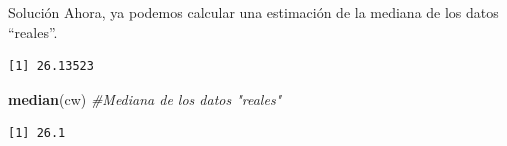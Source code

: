 \documentclass[
  ignorenonframetext,
  aspectratio=169]{beamer}
\newenvironment{Shaded}{\begin{snugshade}}{\end{snugshade}}
\newcommand{\CommentTok}[1]{\textcolor[rgb]{0.56,0.35,0.01}{\textit{#1}}}
\newcommand{\DecValTok}[1]{\textcolor[rgb]{0.00,0.00,0.81}{#1}}
\newcommand{\FunctionTok}[1]{\textcolor[rgb]{0.13,0.29,0.53}{\textbf{#1}}}
\newcommand{\NormalTok}[1]{#1}
\newcommand{\OtherTok}[1]{\textcolor[rgb]{0.56,0.35,0.01}{#1}}
\newcommand{\SpecialCharTok}[1]{\textcolor[rgb]{0.81,0.36,0.00}{\textbf{#1}}}
\begin{document}
\begin{frame}[fragile]{Solución}
\label{soluciuxf3n-34}
Ahora, ya podemos calcular una estimación de la mediana de los datos
``reales''.

\begin{Shaded}
\end{Shaded}

\begin{verbatim}
[1] 26.13523
\end{verbatim}

\begin{Shaded}
\begin{Highlighting}[]
\FunctionTok{median}\NormalTok{(cw) }\CommentTok{\#Mediana de los datos "reales"}
\end{Highlighting}
\end{Shaded}

\begin{verbatim}
[1] 26.1
\end{verbatim}
\end{frame}
\end{document}
